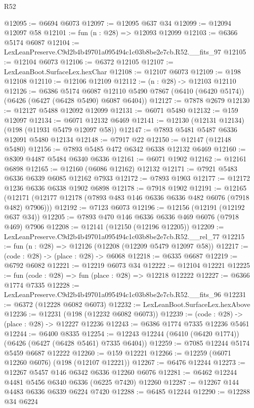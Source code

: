 \begin{lexlean}{R52}
\begin{coremodule}
@12095 := @6694 @6073
@12097 := @12095 @637 @34
@12099 := @12094 @12097 @58
@12101 := fun (n : @28) => @12093 @12099
@12103 := @6366 @5174 @6087
@12104 := LexLeanPreserve.C9d2b4b49701a095494c1c03b8be2e7cb.R52.__fits_97
@12105 := @12104 @6073
@12106 := @6372 @12105
@12107 := LexLeanBoot.SurfaceLex.hexChar
@12108 := @12107 @6073
@12109 := @198 @12108
@12110 := @12106 @12109
@12112 := (n : @28) -> @12103 @12110
@12126 := @6386
    @5174
    @6087
    @12110
    @5490
    @7867
    (@6410 (@6420 @5174))
    (@6426 (@6427 (@6428 @5490) @6087 @6404))
@12127 := @7878 @2679
@12130 := @12127 @5488 @12092 @12099
@12131 := @6071 @5480
@12132 := @159 @12097
@12134 := @6071 @12132 @6469
@12141 := @12130 (@12131 @12134) (@198 (@11931 @5479 @12097 @58))
@12147 := @7893 @5481 @5487 @6336 @12091 @5480 @12134
@12148 := @7917 @22
@12150 := @12147 (@12148 @5480)
@12156 := @7893 @5485 @472 @6342 @6338 @12132 @6469
@12160 := @8309 @4487 @5484 @6340 @6336
@12161 := @6071 @1902
@12162 := @12161 @6898
@12165 := @12160 (@6086 @12162) @12132
@12171 := @7921 @5483 @6336 @6339 @6085 @12162 @7933
@12172 := @7893 @1903
@12177 := @12172 @1236 @6336 @6338 @1902 @6898
@12178 := @7918 @1902
@12191 := @12165
    (@12171 (@12177 @12178 (@7893 @483 @146 @6336 @6336 @482 @6076 (@7918 @482) @7906)))
@12192 := @7123 @6073
@12196 := @12156 (@12191 (@12192 @637 @34))
@12205 := @7893 @470 @146 @6336 @6336 @469 @6076 (@7918 @469) @7906
@12208 := @12141 (@12150 (@12196 @12205))
@12209 := LexLeanPreserve.C9d2b4b49701a095494c1c03b8be2e7cb.R52.__rel_77
@12215 := fun (n : @28) => @12126 (@12208 (@12209 @5479 @12097 @58))
@12217 := (code : @28) -> (place : @28) -> @6068
@12218 := @6335 @6687
@12219 := @6792 @6082
@12221 := @12219 @6073 @34
@12222 := @12104 @12221
@12225 := fun (code : @28) => fun (place : @28) => @12218 @12222
@12227 := @6366 @1774 @7335
@12228 := LexLeanPreserve.C9d2b4b49701a095494c1c03b8be2e7cb.R52.__fits_96
@12231 := @6372 (@12228 @6082 @6073)
@12232 := LexLeanBoot.SurfaceLex.hexAbove
@12236 := @12231 (@198 (@12232 @6082 @6073))
@12239 := (code : @28) -> (place : @28) -> @12227 @12236
@12243 := @6386 @1774 @7335 @12236 @5461
@12244 := @6400 @8335
@12254 := @12243 @12244 (@6410 (@6420 @1774)) (@6426 (@6427 (@6428 @5461) @7335 @6404))
@12259 := @7085 @12244 @5174 @5459 @6687 @12222
@12260 := @159 @12221
@12266 := @12259 (@6071 @12260 @6076) (@198 (@12107 @12221))
@12267 := @6476 @12244
@12273 := @12267 @5457 @146 @6342 @6336 @12260 @6076
@12281 := @6462 @12244 @4481 @5456 @6340 @6336 (@6225 @7420) @12260
@12287 := @12267 @144 @4483 @6336 @6339 @6224 @7420
@12288 := @6485 @12244
@12290 := @12288 @34 @6224

\end{coremodule}
\end{lexlean}
